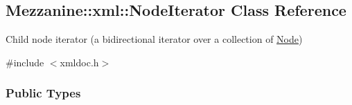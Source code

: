 \hypertarget{classMezzanine_1_1xml_1_1NodeIterator}{
\subsection{Mezzanine::xml::NodeIterator Class Reference}
\label{classMezzanine_1_1xml_1_1NodeIterator}
}


Child node iterator (a bidirectional iterator over a collection of \hyperlink{classMezzanine_1_1xml_1_1Node}{Node})  




{\ttfamily \#include $<$xmldoc.h$>$}

\subsubsection*{Public Types}
